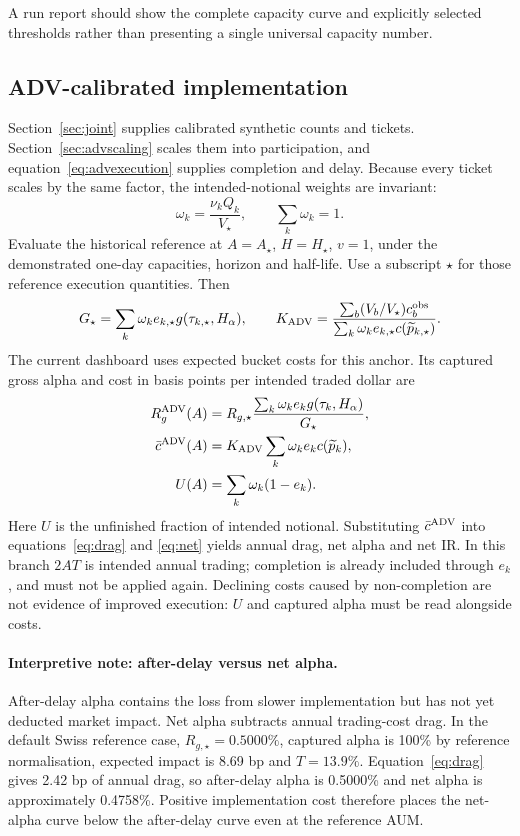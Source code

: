 \documentclass[11pt,a4paper]{article}
\numberwithin{equation}{section}
\begin{document}
A run report should show the complete capacity curve and explicitly selected thresholds rather
than presenting a single universal capacity number.


\subsection{ADV-calibrated implementation}\label{sec:advnet}
Section~\ref{sec:joint} supplies calibrated synthetic counts and tickets. Section~\ref{sec:advscaling}
scales them into participation, and equation~\eqref{eq:advexecution} supplies completion and delay.
Because every ticket scales by the same factor, the intended-notional weights are invariant:
\begin{equation}\label{eq:advweights}
 \omega_k=\frac{\nu_kQ_k}{V_\star},\qquad \sum_k\omega_k=1.
\end{equation}
Evaluate the historical reference at $A=A_\star$, $H=H_\star$, $v=1$, under the demonstrated
one-day capacities, horizon and half-life. Use a subscript $\star$ for those reference execution
quantities. Then
\begin{equation}\label{eq:advnormalisation}
 G_\star=\sum_k\omega_ke_{k,\star}g(\tau_{k,\star},H_\alpha),\qquad
 K_{\rm ADV}=\frac{\sum_b(V_b/V_\star)c_b^{\rm obs}}
 {\sum_k\omega_ke_{k,\star}c(\widetilde p_{k,\star})}.
\end{equation}
The current dashboard uses expected bucket costs for this anchor. Its captured gross alpha and
cost in basis points per intended traded dollar are
\begin{equation}\label{eq:advnetinputs}
 \begin{aligned}
 R_g^{\rm ADV}(A)&=R_{g,\star}
 \frac{\sum_k\omega_ke_kg(\tau_k,H_\alpha)}{G_\star},\\
 \bar c^{\rm ADV}(A)&=K_{\rm ADV}\sum_k\omega_ke_kc(\widetilde p_k),\\
 U(A)&=\sum_k\omega_k(1-e_k).
 \end{aligned}
\end{equation}
Here $U$ is the unfinished fraction of intended notional. Substituting $\bar c^{\rm ADV}$ into
equations~\eqref{eq:drag} and \eqref{eq:net} yields annual drag, net alpha and net IR. In this
branch $2AT$ is intended annual trading; completion is already included through $e_k$, and must
not be applied again. Declining costs caused by non-completion are not evidence of improved
execution: $U$ and captured alpha must be read alongside costs.

\paragraph{Interpretive note: after-delay versus net alpha.}
After-delay alpha contains the loss from slower implementation but has not yet deducted market
impact. Net alpha subtracts annual trading-cost drag. In the default Swiss reference case,
$R_{g,\star}=0.5000\%$, captured alpha is 100\% by reference normalisation, expected impact is
8.69 bp and $T=13.9\%$. Equation~\eqref{eq:drag} gives 2.42 bp of annual drag, so after-delay
alpha is 0.5000\% and net alpha is approximately 0.4758\%. Positive implementation cost therefore
places the net-alpha curve below the after-delay curve even at the reference AUM.
\end{document}
